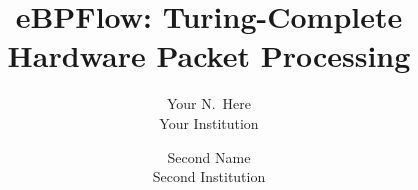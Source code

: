 \usepackage{comment}

\usepackage{subfig}


\usepackage{todonotes}
\newcommand{\marcos}[1]{\todo[author=Marcos,inline]{#1}}
\newcommand{\barath}[1]{\todo[author=Barath,inline]{#1}}

\usepackage{xspace}
\newcommand{\system}{eBPFlow\xspace}
\newcommand{\eg}{\emph{e.g.,}\xspace}






\date{}

\title{\Large \bf eBPFlow: Turing-Complete Hardware Packet Processing}

\author{
{\rm Your N.\ Here}\\
Your Institution
\and
{\rm Second Name}\\
Second Institution
} %

\maketitle









%






